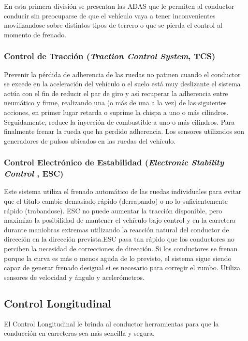 En esta primera división se presentan las ADAS que le permiten al conductor conducir sin preocuparse de que el vehículo vaya a tener inconvenientes movilizandose sobre distintos tipos de terrero o que se pierda el control al momento de frenado.

\subsubsection{Control de Tracción {\footnotesize(\textit{Traction Control System}, TCS)}}

Prevenir la pérdida de adherencia de las ruedas no patinen cuando el conductor se excede en la aceleración del vehículo o el suelo está muy deslizante el sistema actúa con el fin de reducir el par de giro y así recuperar la adherencia entre neumático y firme, realizando una (o más de una a la vez) de las siguientes acciones, en primer lugar retarda o suprime la chispa a uno o más cilindros. Seguidamente, reduce la inyección de combustible a uno o más cilindros. Para finalmente frenar la rueda que ha perdido adherencia. Los sensores utilizados son generadores de pulsos ubicados en las ruedas del vehículo.

\subsubsection{Control Electrónico de Estabilidad {\footnotesize(\textit{Electronic Stability Control }, ESC)}}

Este sistema utiliza el frenado automático de las ruedas individuales para evitar que el título cambie demasiado rápido (derrapando) o no lo suficientemente rápido (trabandose). ESC no puede aumentar la tracción disponible, pero maximiza la posibilidad de mantener el vehículo bajo control y en la carretera durante maniobras extremas utilizando la reacción natural del conductor de dirección en la dirección prevista\cite{Hospach2014}.ESC pasa tan rápido que los conductores no perciben la necesidad de correcciones de dirección. Si los conductores se frenan porque la curva es más o menos aguda de lo previsto, el sistema sigue siendo capaz de generar frenado desigual si es necesario para corregir el rumbo. Utiliza sensores de velocidad y ángulo y acelerómetros.

\subsection{Control Longitudinal}

El Control Longitudinal le brinda al conductor herramientas para que la conducción en carreteras sea más sencilla y segura.


